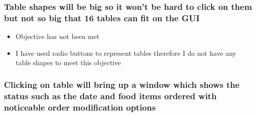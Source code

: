 \subsubsection{Table shapes will be big so it won't be hard to click on them but not so big that 16 tables can fit on the GUI}
\begin{itemize}
	\item Objective has not been met
	\item I have used radio buttons to represent tables therefore I do not have any table shapes to meet this objective

\end{itemize}

\subsubsection{Clicking on table will bring up a window which shows the status such as the date and food items ordered with noticeable order modification options}

